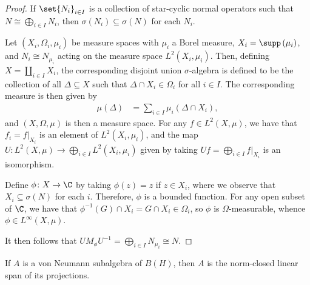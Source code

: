 \documentclass[10pt]{mypackage}
\begin{document}
\begin{proof}
  If $\set{N_i}_{i\in I}$ is a collection of star-cyclic normal operators such that $N\cong \bigoplus_{i\in I}N_i$, then $\sigma\left( N_i \right)\subseteq \sigma\left( N \right)$ for each $N_i$.

  Let $\left( X_i,\Omega_i,\mu_i \right)$ be measure spaces with $\mu_i$ a Borel measure, $X_i = \supp\left( \mu_i \right)$, and $N_i\cong N_{\mu_i}$ acting on the measure space $L^2\left( X_i, \mu_i \right)$. Then, defining $X = \coprod_{i\in I}X_i$, the corresponding disjoint union $\sigma$-algebra is defined to be the collection of all $\Delta\subseteq X$ such that $\Delta\cap X_i\in \Omega_i$ for all $i\in I$. The corresponding measure is then given by
  \begin{align*}
    \mu\left( \Delta \right) &= \sum_{i\in I}\mu_i\left( \Delta\cap X_i \right),
  \end{align*}
  and $\left( X,\Omega,\mu \right)$ is then a measure space. For any $f\in L^2\left( X,\mu \right)$, we have that $f_i = f|_{X_i}$ is an element of $L^2\left( X_i,\mu_i \right)$, and the map $U\colon L^2\left( X,\mu \right)\rightarrow \bigoplus_{i\in I}L^2\left( X_i,\mu_i \right)$ given by taking $Uf = \bigoplus_{i\in I}f|_{X_i}$ is an isomorphism.

  Define $\phi\colon X\rightarrow \C$ by taking $\phi(z) = z$ if $z\in X_i$, where we observe that $X_i\subseteq \sigma(N)$ for each $i$. Therefore, $\phi$ is a bounded function. For any open subset of $\C$, we have that $\phi^{-1}\left( G \right)\cap X_i = G\cap X_i\in \Omega_{i}$, so $\phi$ is $\Omega$-measurable, whence $\phi\in L^{\infty}\left( X,\mu \right)$.

  It then follows that $UM_{\phi}U^{-1} = \bigoplus_{i\in I}N_{\mu_i}\cong N$.
\end{proof}
\begin{proposition}
  If $A$ is a von Neumann subalgebra of $B\left( H \right)$, then $A$ is the norm-closed linear span of its projections.
\end{proposition}
\end{document}
